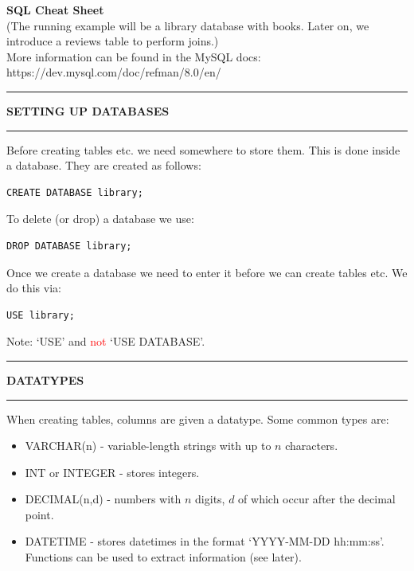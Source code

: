 \documentclass[8pt]{extarticle}
\newcommand{\heading}[1]{%
    \noindent
    \rule{\linewidth}{0.4pt}
    \begin{center}
        \vspace{-1ex}
        \textbf{#1}        
        \vspace{-2.5ex}
    \end{center}
    \rule{\linewidth}{0.4pt}
}
\begin{document}
\thispagestyle{empty} 

\begin{center}   
{\huge\textbf{SQL Cheat Sheet}}\\
\vspace*{0.25cm}
(The running example will be a library database with books. Later on, we introduce a reviews table to perform joins.)\\
\vspace*{0.1cm}
More information can be found in the MySQL docs: https://dev.mysql.com/doc/refman/8.0/en/
\vspace*{0.5cm}
\end{center}

\begin{multicols}{4}
\setlength{\columnseprule}{1pt} %


\heading{SETTING UP DATABASES}

Before creating tables etc. we need somewhere to store them. This is done inside a database. They are created as follows:

\vspace{0.5ex}
\begin{lstlisting}[style=sql]
CREATE DATABASE library;
\end{lstlisting}
\vspace{0.5ex}

To delete (or drop) a database we use:

\vspace{0.5ex}
\begin{lstlisting}[style=sql]
DROP DATABASE library;
\end{lstlisting}
\vspace{0.5ex}

Once we create a database we need to enter it before we can create tables etc. We do this via:

\vspace{0.5ex}
\begin{lstlisting}[style=sql]
USE library;
\end{lstlisting}
\vspace{0.5ex}

Note: `USE' and \textcolor{red}{not} `USE DATABASE'.\\

\heading{DATATYPES}

When creating tables, columns are given a datatype. Some common types are:
\begin{itemize}[leftmargin=*]
    \item VARCHAR(n) - variable-length strings with up to $n$ characters.
    \item INT or INTEGER - stores integers.
    \item DECIMAL(n,d) - numbers with $n$ digits, $d$ of which occur after the decimal point.
    \item DATETIME - stores datetimes in the format `YYYY-MM-DD hh:mm:ss'. Functions can be used to extract information (see later).
\end{itemize}


\end{multicols}
\end{document}
